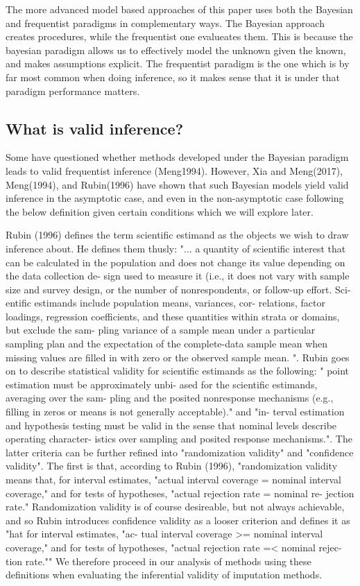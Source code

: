 \documentclass{article}
\begin{document}
	The more advanced model based approaches of this paper uses both the Bayesian and frequentist paradigms in complementary ways. The Bayesian approach creates procedures, while the frequentist one evalueates them. This is because the bayesian paradigm allows us to effectively model the unknown given the known, and makes assumptions explicit. The frequentist paradigm is the one which is by far most common when doing inference, so it makes sense that it is under that paradigm performance matters.
	
	\subsection{What is valid inference?}
	Some have questioned whether methods developed under the Bayesian paradigm leads to valid frequentist inference (Meng1994). However, Xia and Meng(2017), Meng(1994), and Rubin(1996) have shown that such Bayesian models yield valid inference in the asymptotic case, and even in the non-asymptotic case following the below definition given certain conditions which we will explore later.
	
	Rubin (1996) defines the term scientific estimand as the objects we wish to draw inference about. He defines them thusly: "... a quantity of scientific
	interest that can be calculated in the population and does
	not change its value depending on the data collection de-
	sign used to measure it (i.e., it does not vary with sample
	size and survey design, or the number of nonrespondents,
	or follow-up effort. Sci-
	entific estimands include population means, variances, cor-
	relations, factor loadings, regression coefficients, and these
	quantities within strata or domains, but exclude the sam-
	pling variance of a sample mean under a particular sampling
	plan and the expectation of the complete-data sample mean
	when missing values are filled in with zero or the observed sample mean. ". Rubin goes on to describe statistical validity for scientific estimands as the following: " point estimation must be approximately unbi-
	ased for the scientific estimands, averaging over the sam-
	pling and the posited nonresponse mechanisms (e.g., filling
	in zeros or means is not generally acceptable)." and "in-
	terval estimation and hypothesis testing must be valid in
	the sense that nominal levels describe operating character-
	istics over sampling and posited response mechanisms.". The latter criteria can be further refined into "randomization validity" and "confidence validity". The first is that, according to Rubin (1996),  "randomization validity means that, for interval estimates,
	"actual interval coverage = nominal interval coverage," and
	for tests of hypotheses, "actual rejection rate = nominal re-
	jection rate."  Randomization validity is of course desireable, but not always achievable, and so Rubin introduces confidence validity as a looser criterion and defines it as "hat for interval estimates, "ac-
	tual interval coverage >= nominal interval coverage," and for
	tests of hypotheses, "actual rejection rate =< nominal rejec-
	tion rate."" We therefore proceed in our analysis of methods using these definitions when evaluating the inferential validity of imputation methods.
	
\end{document}
